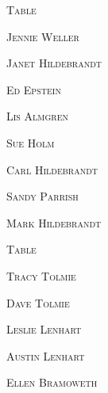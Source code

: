 \documentclass[12pt]{article}
\begin{document}
\vspace*{.25in}

\textsc{\Huge Table}
\vspace*{.3in}


\vspace*{\fill}

\textsc{\Huge Jennie Weller}

\vspace*{.15in}
\textsc{\Huge Janet Hildebrandt}

\vspace*{.15in}
\textsc{\Huge Ed Epstein}

\vspace*{.15in}
\textsc{\Huge Lis Almgren}

\vspace*{.15in}
\textsc{\Huge Sue Holm}

\vspace*{.15in}
\textsc{\Huge Carl Hildebrandt}

\vspace*{.15in}
\textsc{\Huge Sandy Parrish}

\vspace*{.15in}
\textsc{\Huge Mark Hildebrandt}

\vspace*{\fill}

\newpage

\vspace*{.25in}

\textsc{\Huge Table}
\vspace*{.3in}


\vspace*{\fill}

\textsc{\Huge Tracy Tolmie}

\vspace*{.15in}
\textsc{\Huge Dave Tolmie}

\vspace*{.15in}
\textsc{\Huge Leslie Lenhart}

\vspace*{.15in}
\textsc{\Huge Austin Lenhart}

\vspace*{.15in}
\textsc{\Huge Ellen Bramoweth}
\end{document}
